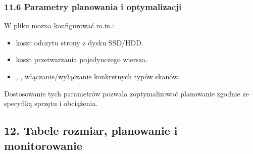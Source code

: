 \documentclass[letterpaper,10pt,polish]{sphinxmanual}
\begin{document}
\sphinxAtStartPar
{}

\begin{sphinxVerbatim}[commandchars=\\\{\}]
        
    
\end{sphinxVerbatim}


\subsubsection{11.6 Parametry planowania i optymalizacji}
\label{\detokenize{rozdzial2/Konfiguracja_baz_danych/Konfiguracja_baz_danych:parametry-planowania-i-optymalizacji}}
\sphinxAtStartPar
W pliku  można konfigurować m.in.:
\begin{itemize}
\item {} 
\sphinxAtStartPar
{} \textendash{} koszt odczytu strony z dysku SSD/HDD.

\item {} 
\sphinxAtStartPar
{} \textendash{} koszt przetwarzania pojedynczego wiersza.

\item {} 
\sphinxAtStartPar
{}, ,  \textendash{} włączanie/wyłączanie konkretnych typów skanów.

\end{itemize}

\sphinxAtStartPar
Dostosowanie tych parametrów pozwala zoptymalizować planowanie zgodnie ze specyfiką sprzętu i obciążenia.


\subsection{12. Tabele \textendash{} rozmiar, planowanie i monitorowanie}
\label{\detokenize{rozdzial2/Konfiguracja_baz_danych/Konfiguracja_baz_danych:tabele-rozmiar-planowanie-i-monitorowanie}}
\end{document}
